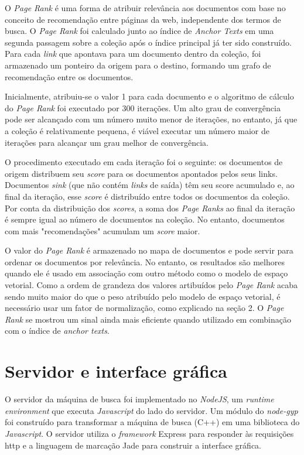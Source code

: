 \documentclass{article}
\begin{document}
O \textit{Page Rank} é uma forma de atribuir relevância aos documentos com base
no conceito de recomendação entre páginas da web, independente dos termos de busca. 
O \textit{Page Rank} foi calculado junto ao índice de \textit{Anchor Texts} 
em uma segunda passagem sobre a coleção após o índice principal já ter sido construído. Para cada \textit{link}
que apontava para um documento dentro da coleção, foi armazenado um ponteiro da origem para o destino,
formando um grafo de recomendação entre os documentos.

Inicialmente, atribuiu-se o valor 1 para cada documento e o algoritmo de cálculo do \textit{Page Rank} foi executado por 300 iterações.
Um alto grau de convergência pode ser alcançado com um número muito menor de iterações, no entanto, já que a coleção é relativamente
pequena, é viável executar um número maior de iterações para alcançar um grau melhor de convergência.

O procedimento executado em cada iteração foi o seguinte: os documentos de origem distribuem seu \textit{score} para os documentos apontados 
pelos seus links. Documentos \textit{sink} (que não contém \textit{links} de saída) têm seu score acumulado e, ao final da iteração,
esse \textit{score} é distribuído entre todos os documentos da coleção. Por conta da distribuição dos \textit{scores}, 
a soma dos \textit{Page Ranks} ao final da iteração é sempre igual ao número de documentos na coleção. No entanto, documentos com
mais "recomendações" acumulam um \textit{score} maior. 

O valor do \textit{Page Rank} é armazenado no mapa de documentos e pode servir para ordenar os documentos por
relevância. No entanto, os resultados são melhores quando ele é usado em associação com outro método como o modelo
de espaço vetorial. Como a ordem de grandeza dos valores artibuídos pelo \textit{Page Rank} acaba sendo muito maior
do que o peso atribuído pelo modelo de espaço vetorial, é necessário usar um fator de normalização, como explicado
na seção 2. O \textit{Page Rank} se mostrou um sinal ainda mais eficiente quando utilizado
em combinação com o índice de \textit{anchor texts}.

\section{Servidor e interface gráfica}

O servidor da máquina de busca foi implementado no \textit{NodeJS}, um \textit{runtime environment} 
que executa \textit{Javascript} do lado do servidor. Um módulo do \textit{node-gyp} foi construído
para transformar a máquina de busca (C++) em uma biblioteca do \textit{Javascript}. O servidor
utiliza o \textit{framework} Express para responder às requisições http e a linguagem de marcação 
Jade para construir a interface gráfica. 
\end{document}
